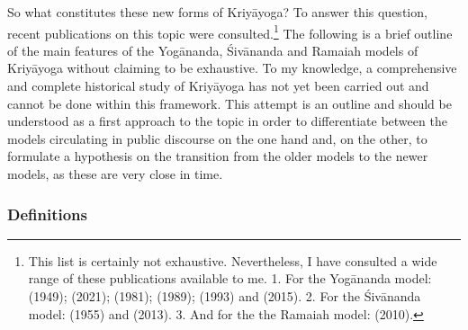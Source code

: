 So what constitutes these new forms of Kriyāyoga? To answer this question, recent publications on this topic were consulted.\footnote{This list is certainly not exhaustive. Nevertheless, I have consulted a wide range of these publications available to me. 1. For the Yogānanda model: \citeauthor{autobioyogi} (1949); \citeauthor{kriyayogalowenstein} (2021); \citeauthor{kriyayogasarasvati1981} (1981); \citeauthor{hariharananda1989} (1989); \citeauthor{kriyayogaupanishad1993} (1993) and \citeauthor{kriyayogasturgess2015} (2015). 2. For the Śivānanda model: \citeauthor{shivanandakriya1982} (1955) and \citeauthor{kriyayoganityananda2013} (2013). 3. And for the the Ramaiah model: \citeauthor{govindan2010} (2010).} The following is a brief outline of the main features of the Yogānanda, Śivānanda and Ramaiah models of Kriyāyoga without claiming to be exhaustive. To my knowledge, a comprehensive and complete historical study of Kriyāyoga has not yet been carried out and cannot be done within this framework. This attempt is an outline and should be understood as a first approach to the topic in order to differentiate between the models circulating in public discourse on the one hand and, on the other, to formulate a hypothesis on the transition from the older models to the newer models, as these are very close in time.  

\subsubsection{Definitions}

